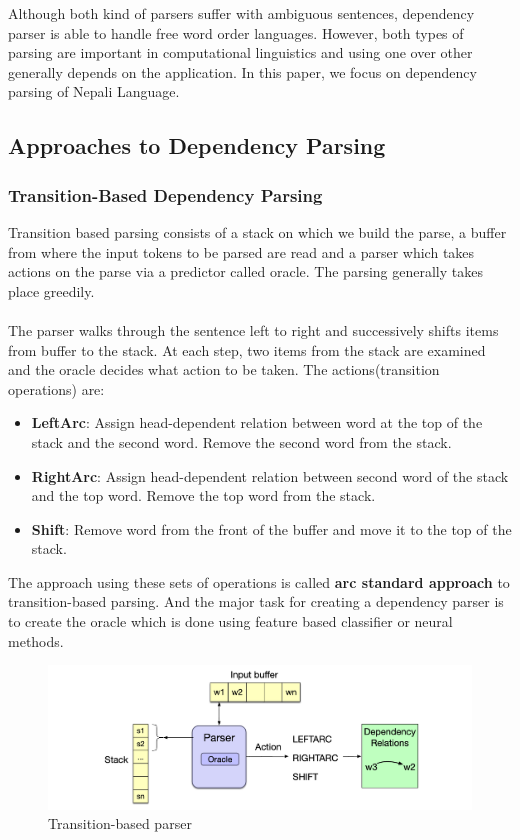     \newline
Although both kind of parsers suffer with ambiguous sentences, dependency
parser is able to handle free word order languages. However, both types of
parsing are important in computational linguistics and using one over other
generally depends on the application. In this paper, we focus on dependency
parsing of Nepali Language.

\subsection*{Approaches to Dependency Parsing}
\subsubsection*{Transition-Based Dependency Parsing}
Transition based parsing consists of a stack on which we build the parse, a
buffer from where the input tokens to be parsed are read and a parser which
takes actions on the parse via a predictor called oracle. The parsing generally
takes place greedily.
\\~\\
The parser walks through the sentence left to right and successively shifts
items from buffer to the stack. At each step, two items from the stack are
examined and the oracle decides what action to be taken. The actions(transition
operations) are:
\begin{itemize}
    \item \textbf{LeftArc}: Assign head-dependent relation between word at the top of the stack and the second word. Remove the second word from the stack.
    \item \textbf{RightArc}: Assign head-dependent relation between second word of the stack and the top word. Remove the top word from the stack.
    \item \textbf{Shift}: Remove word from the front of the buffer and move it to the top of the stack.
\end{itemize}
The approach using these sets of operations is called \textbf{arc standard
approach} to transition-based parsing. And the major task for creating a
dependency parser is to create the oracle which is done using feature based
classifier or neural methods.
\begin{figure}[!h]
    \center
    \includegraphics[scale=0.2]{images/transition_based_parser}
    \caption{Transition-based parser\cite{stanfordLec}}
    \label{fig:transition_based_parser}
\end{figure}

